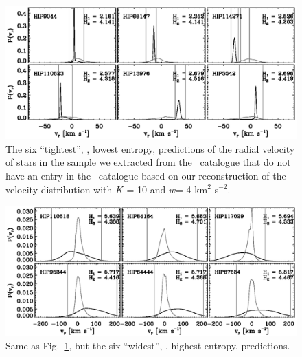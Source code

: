 \clearpage
\begin{figure}
\includegraphics{figs_veldist/info_hip_low.ps}
\caption[The six ``tightest'', \ie, lowest entropy, predictions of the radial velocity of stars in the sample we extracted from the \Hipparcos\ catalogue that do not have an entry in the \gcsabb\ catalogue based on our reconstruction of the velocity distribution]{The six ``tightest'', \ie, lowest entropy, predictions of the radial velocity of stars in the sample we extracted from the \Hipparcos\ catalogue that do not have an entry in the \gcsabb\ catalogue based on our reconstruction of the velocity distribution with $K$ = 10 and $w$= 4 km$^2$ s$^{-2}$.}%
\label{fig:info_hip_low}
\end{figure}

\clearpage
\begin{figure}
\includegraphics{figs_veldist/info_hip_high.ps}
\caption[Same as Fig.~\ref{fig:info_hip_low}, but the six ``widest'', \ie, highest entropy, predictions]{Same as Fig.~\ref{fig:info_hip_low}, but the six ``widest'', \ie, highest entropy, predictions.}%
\label{fig:info_hip_high}
\end{figure}


